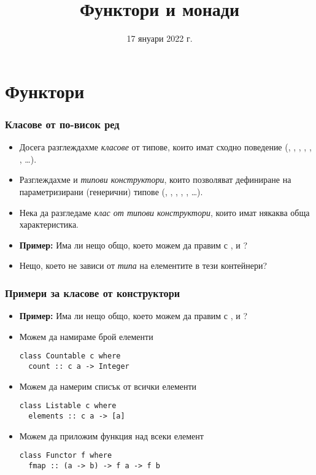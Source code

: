 \documentclass[alsotrans]{beamerswitch}
\title{Функтори и монади}
\date{17 януари 2022 г.}
\begin{document}
\begin{frame}
  \titlepage
\end{frame}

\section{Функтори}

\begin{frame}[fragile]
  \frametitle{Класове от по-висок ред}

  \begin{itemize}[<+->]
  \item Досега разглеждахме \emph{класове} от типове, които имат
    сходно поведение (, , , ,
    , , \ldots).
  \item
    Разглеждахме и \emph{типови конструктори}, които позволяват дефиниране на параметризирани (генерични) типове (, \lst{[]}, , , , \ldots).
  \item
    Нека да разгледаме \emph{клас от типови конструктори}, които имат някаква обща характеристика.
  \item
    \textbf{Пример:} Има ли нещо общо, което можем да правим с \lst{[]},  и ?
  \item Нещо, което не зависи от \emph{типа} на елементите в тези контейнери?
  \end{itemize}
\end{frame}

\begin{frame}[fragile]
  \frametitle{Примери за класове от конструктори}
  \begin{itemize}[<+->]
  \item
    \textbf{Пример:} Има ли нещо общо, което можем да правим с \lst{[]},  и ?
  \item Можем да намираме брой елементи
\begin{lstlisting}
class Countable c where
  count :: c a -> Integer
\end{lstlisting}
  \item Можем да намерим списък от всички елементи
\begin{lstlisting}
class Listable c where
  elements :: c a -> [a]
\end{lstlisting}
  \item Можем да приложим функция над всеки елемент
\begin{lstlisting}
class Functor f where
  fmap :: (a -> b) -> f a -> f b
\end{lstlisting}
\end{itemize}
\end{frame}
\end{document}
